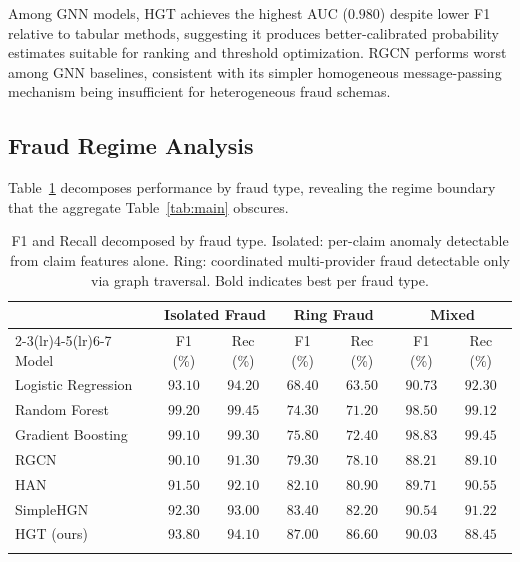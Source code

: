 \documentclass[pdflatex,sn-mathphys-num]{sn-jnl}
\theoremstyle{thmstyleone}
\theoremstyle{thmstyletwo}
\theoremstyle{thmstylethree}
\begin{document}
Among GNN models, HGT achieves the highest AUC ($0.980$) despite lower
F1 relative to tabular methods, suggesting it produces better-calibrated
probability estimates suitable for ranking and threshold optimization.
RGCN performs worst among GNN baselines, consistent with its simpler
homogeneous message-passing mechanism being insufficient for
heterogeneous fraud schemas.

\subsection{Fraud Regime Analysis}\label{sec:regime}

Table~\ref{tab:regime} decomposes performance by fraud type, revealing
the regime boundary that the aggregate Table~\ref{tab:main} obscures.

\begin{table}[h]
\caption{F1 and Recall decomposed by fraud type. Isolated: per-claim
  anomaly detectable from claim features alone. Ring: coordinated
  multi-provider fraud detectable only via graph traversal. Bold
  indicates best per fraud type.}\label{tab:regime}
\begin{tabular}{@{}lcccccc@{}}
\toprule
& \multicolumn{2}{c}{Isolated Fraud} & \multicolumn{2}{c}{Ring Fraud} & \multicolumn{2}{c}{Mixed} \\
\cmidrule(lr){2-3}\cmidrule(lr){4-5}\cmidrule(lr){6-7}
Model & F1 (\%) & Rec (\%) & F1 (\%) & Rec (\%) & F1 (\%) & Rec (\%) \\
\midrule
Logistic Regression & $93.10$ & $94.20$ & $68.40$ & $63.50$ & $90.73$ & $92.30$ \\
Random Forest       & $\mathbf{99.20}$ & $\mathbf{99.45}$ & $74.30$ & $71.20$ & $98.50$ & $99.12$ \\
Gradient Boosting   & $99.10$ & $99.30$ & $75.80$ & $72.40$ & $98.83$ & $99.45$ \\
\midrule
RGCN                & $90.10$ & $91.30$ & $79.30$ & $78.10$ & $88.21$ & $89.10$ \\
HAN                 & $91.50$ & $92.10$ & $82.10$ & $80.90$ & $89.71$ & $90.55$ \\
SimpleHGN           & $92.30$ & $93.00$ & $83.40$ & $82.20$ & $90.54$ & $91.22$ \\
HGT (ours)          & $93.80$ & $94.10$ & $\mathbf{87.00}$ & $\mathbf{86.60}$ & $90.03$ & $88.45$ \\
\botrule
\end{tabular}
\end{table}
\end{document}
